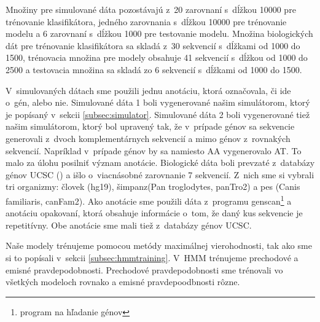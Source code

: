 Množiny pre simulované dáta pozostávajú z~20 zarovnaní s~dĺžkou 10000 pre trénovanie klasifikátora, jedného zarovnania s~dĺžkou 10000 pre trénovanie modelu a 6 zarovnaní s~dĺžkou 1000 pre testovanie modelu.
Množina biologických dát pre trénovanie klasifikátora sa skladá z~30 sekvencií s~dĺžkami od 1000 do 1500, trénovacia množina pre modely obsahuje 41 sekvencií s~dĺžkou od 1000 do 2500 a testovacia množina sa skladá zo 6 sekvencií s~dĺžkami od 1000 do 1500.

V~simulovaných dátach sme použili jednu anotáciu, ktorá označovala, či ide o~gén, alebo nie.
Simulované dáta 1 boli vygenerované našim simulátorom, ktorý je popísaný v~sekcii \ref{subsec:simulator}.
Simulované dáta 2 boli vygenerované tiež našim simulátorom, ktorý bol upravený tak, že v~prípade génov sa sekvencie generovali z~dvoch komplementárnych sekvencií a mimo génov z~rovnakých sekvencií. Napríklad v~prípade génov by sa namiesto AA vygenerovalo AT. To malo za úlohu posilniť význam anotácie.
Biologické dáta boli prevzaté z~databázy génov UCSC (\cite{karolchik2003ucsc}) a išlo o~viacnásobné zarovnanie 7 sekvencií.
Z~nich sme si vybrali tri organizmy: človek (hg19), šimpanz(Pan troglodytes, panTro2) a pes (Canis familiaris, canFam2).
Ako anotácie sme použili dáta z~programu genscan\footnote{program na hľadanie génov} a anotáciu opakovaní, ktorá obsahuje informácie o~tom, že daný kus sekvencie je repetitívny. Obe anotácie sme mali tiež z~databázy génov UCSC.


Naše modely trénujeme pomocou metódy maximálnej vierohodnosti, tak ako sme si to popísali v~sekcii \ref{subsec:hmmtraining}. V~HMM trénujeme prechodové a emisné pravdepodobnosti. Prechodové pravdepodobnosti sme trénovali vo všetkých modeloch rovnako a emisné pravdepoodbnosti rôzne.

